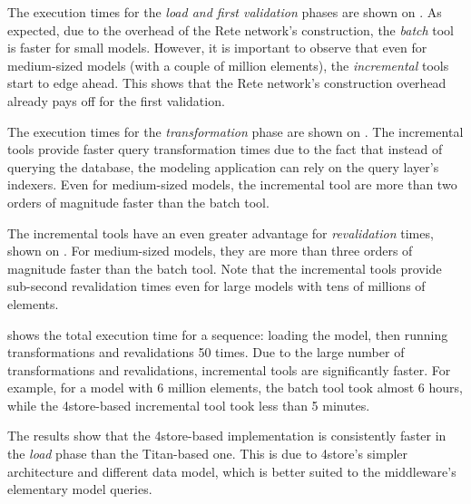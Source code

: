 
The execution times for the \emph{load and first validation} phases are shown on .
As expected, due to the overhead of the Rete network's construction, the \emph{batch} tool is faster for small models. However, it is important to observe that even for medium-sized models (with a couple of million elements), the \emph{incremental} tools start to edge ahead. This shows that the Rete network's construction overhead already pays off for the first validation.


The execution times for the \emph{transformation} phase are shown on . The incremental tools provide faster query transformation times due to the fact that instead of querying the database, the modeling application can rely on the query layer's indexers. Even for medium-sized models, the incremental tool are more than two orders of magnitude faster than the batch tool.


The incremental tools have an even greater advantage for \emph{revalidation} times, shown on . For medium-sized models, they are more than three orders of magnitude faster than the batch tool. Note that the incremental tools provide sub-second revalidation times even for large models with tens of millions of elements.


 shows the total execution time for a sequence: loading the model, then running transformations and revalidations 50 times. Due to the large number of transformations and revalidations, incremental tools are significantly faster. For example, for a model with 6 million elements, the batch tool took almost 6 hours, while the 4store-based incremental tool took less than 5 minutes. 

The results show that the 4store-based \iqd{} implementation is consistently faster in the \emph{load} phase than the Titan-based one. This is due to 4store's simpler architecture and different data model, which is better suited to the \iqd{} middleware's elementary model queries.

